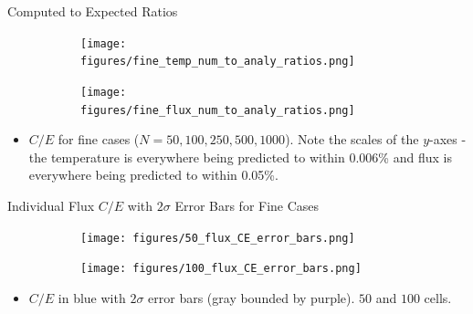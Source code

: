 \documentclass[9pt,t]{beamer}
\begin{document}
\begin{frame}{Computed to Expected Ratios}
    \vspace*{-0.4cm}
    \pause
    \begin{figure}[T]
        \hspace*{-0.87cm}
        \begin{subfigure}{0.495\linewidth}
            \texttt{[image: figures/fine\_temp\_num\_to\_analy\_ratios.png]}
        \end{subfigure}\hspace*{0.85cm}
        \begin{subfigure}{0.495\linewidth}
            \texttt{[image: figures/fine\_flux\_num\_to\_analy\_ratios.png]}
        \end{subfigure}
    \end{figure}
    \begin{itemize}
        \item $C/E$ for fine cases ($N=50,100,250,500,1000$). Note the scales of the $y$-axes - the temperature is everywhere being predicted to within 0.006\% and flux is everywhere being predicted to within 0.05\%.
    \end{itemize}
\end{frame}

\begin{frame}{Individual Flux $C/E$ with $2\sigma$ Error Bars for Fine Cases}
    \begin{figure}[T]
        \hspace*{-1.1cm}
        \begin{subfigure}{0.495\textwidth}
            \texttt{[image: figures/50\_flux\_CE\_error\_bars.png]}
        \end{subfigure}\hspace*{0.89cm}
        \begin{subfigure}{0.495\textwidth}
            \texttt{[image: figures/100\_flux\_CE\_error\_bars.png]}
        \end{subfigure}
    \end{figure}
    \begin{itemize}
        \item $C/E$ in blue with $2\sigma$ error bars (gray bounded by purple). $50$ and $100$ cells.
    \end{itemize}
\end{frame}
\end{document}
